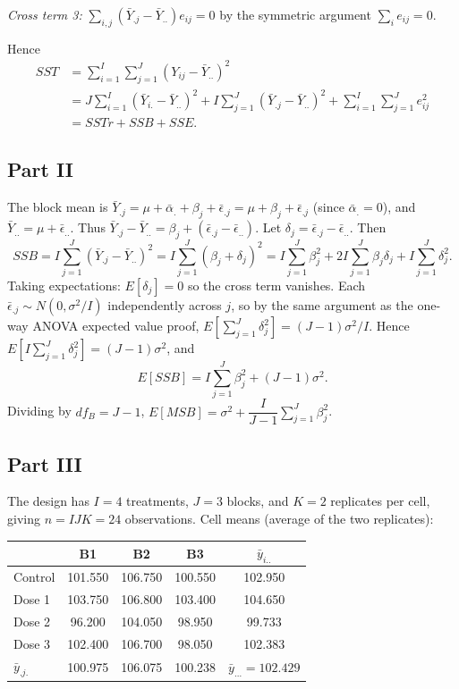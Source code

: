 \documentclass[letterpaper]{article}
\begin{document}
			\textit{Cross term 3:} $\sum_{i,j}(\bar{Y}_{.j}-\bar{Y}_{..})e_{ij} = 0$ by the symmetric argument $\sum_i e_{ij}=0$.
			
			Hence
			\begin{align*}
				SST
				&= \sum_{i=1}^I\sum_{j=1}^J (Y_{ij}-\bar{Y}_{..})^2 \\
				&= J\sum_{i=1}^I(\bar{Y}_{i.}-\bar{Y}_{..})^2
				+ I\sum_{j=1}^J(\bar{Y}_{.j}-\bar{Y}_{..})^2
				+ \sum_{i=1}^I\sum_{j=1}^J e_{ij}^2 \\
				&= SSTr + SSB + SSE. 
			\end{align*}
			
		\clearpage
		\subsection{Part II}
			The block mean is $\bar{Y}_{.j} = \mu + \bar{\alpha}_{.} + \beta_j + \bar{\epsilon}_{.j} = \mu + \beta_j + \bar{\epsilon}_{.j}$
			(since $\bar{\alpha}_{.} = 0$), and $\bar{Y}_{..} = \mu + \bar{\epsilon}_{..}$.
			Thus $\bar{Y}_{.j} - \bar{Y}_{..} = \beta_j + (\bar{\epsilon}_{.j} - \bar{\epsilon}_{..})$.
			Let $\delta_j = \bar{\epsilon}_{.j} - \bar{\epsilon}_{..}$. Then
			\[
			SSB = I\sum_{j=1}^J (\bar{Y}_{.j}-\bar{Y}_{..})^2
			= I\sum_{j=1}^J (\beta_j + \delta_j)^2
			= I\sum_{j=1}^J\beta_j^2
			+ 2I\sum_{j=1}^J \beta_j\delta_j
			+ I\sum_{j=1}^J\delta_j^2.
			\]
			Taking expectations: $E[\delta_j]=0$ so the cross term vanishes.
			Each $\bar{\epsilon}_{.j} \sim N(0, \sigma^2/I)$ independently across $j$,
			so by the same argument as the one-way ANOVA expected value proof,
			$E\!\left[\sum_{j=1}^J \delta_j^2\right] = (J-1)\sigma^2/I$.
			Hence $E\!\left[I\sum_{j=1}^J \delta_j^2\right] = (J-1)\sigma^2$, and
			\[
			E[SSB] = I\sum_{j=1}^J \beta_j^2 + (J-1)\sigma^2.
			\]
			Dividing by $df_B = J-1$,
			$E[MSB] = \sigma^2 + \dfrac{I}{J-1}\displaystyle\sum_{j=1}^J \beta_j^2$. 
			
		\clearpage
		\subsection{Part III}
		
		The design has $I=4$ treatments, $J=3$ blocks, and $K=2$ replicates
			per cell, giving $n = IJK = 24$ observations. Cell means (average of the two replicates):
			
			\begin{center}
				\begin{tabular}{lcccc}
					\hline
					& B1 & B2 & B3 & $\bar{y}_{i..}$ \\
					\hline
					Control & 101.550 & 106.750 & 100.550 & 102.950 \\
					Dose 1  & 103.750 & 106.800 & 103.400 & 104.650 \\
					Dose 2  &  96.200 & 104.050 &  98.950 &  99.733 \\
					Dose 3  & 102.400 & 106.700 &  98.050 & 102.383 \\
					\hline
					$\bar{y}_{.j.}$ & 100.975 & 106.075 & 100.238 & $\bar{y}_{...} = 102.429$ \\
					\hline
				\end{tabular}
			\end{center}
			
\end{document}
